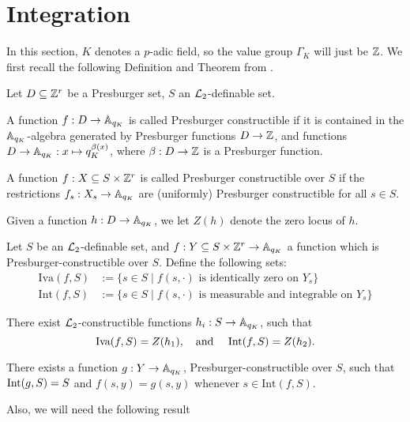 \section{Integration}
In this section, $K$ denotes a $p$-adic field, so the value group $\Gamma_K$ will just be $\Z$.
We first recall the following Definition and Theorem from \cite{Clu-Gor-Hal-14}.
\begin{defn}Let $D \subseteq \ZZ^r$ be a Presburger set, $S$ an $\Lm_2$-definable set.
\item A function $f: D \to \AA_{q_K}$ is called Presburger constructible if it is contained in the $\AA_{q_K}$-algebra generated by Presburger functions $D\to \ZZ$, and functions $D\to \AA_{q_K}: x \mapsto q_K^{\beta(x)}$, where $\beta:D \to \ZZ$ is a Presburger function.
\item A function $f:X\subseteq S \times \ZZ^r$ is called Presburger constructible over $S$ if  the restrictions $f_s: X_s \to \AA_{q_K}$ are (uniformly) Presburger constructible for all $s \in S$. 
\item Given a function $h:D\to \AA_{q_K}$, we let $Z(h)$ denote the zero locus of $h$.
\end{defn}
\begin{def-theorem}\label{thm:presburgerloci} Let $S$ be an $\Lm_2$-definable set, 
and $f:Y\subseteq S\times \ZZ^r\to \AA_{q_K}$ a function which is Presburger-constructible over $S$. Define the following sets:
\begin{align*}
\text{Iva}(f,S)&:=\{s \in S \mid f(s, \cdot) \text{ is identically zero on } Y_s\}\\
\text{Int}(f,S) &:=\{s \in S \mid f(s, \cdot) \text{ is measurable and integrable on } Y_s \}
\end{align*}
\item There exist $\Lm_2$-constructible functions $h_i: S \to \AA_{q_K}$, such that 
\[\text{Iva}(f,S) = Z(h_1), \text{\quad and \quad }
\text{Int}(f,S) = Z(h_2).\]
\item There exists a function $g: Y \to \AA_{q_K}$, Presburger-constructible over $S$, such that $\Int(g,S) = S$ and $f(s,y) = g(s,y)$ whenever $s \in \text{Int}(f,S)$.
\end{def-theorem}
Also, we will need the following result
\begin{thm}

\end{thm}
